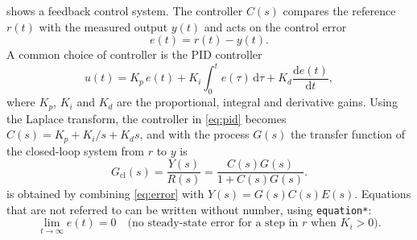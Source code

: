 \begin{instructions}
 shows a feedback control system. The controller $C(s)$ compares the reference $r(t)$ with the measured output $y(t)$ and acts on the control error
\begin{equation}
    e(t) = r(t) - y(t).
    \label{eq:error}
\end{equation}
A common choice of controller is the PID controller
\begin{equation}
    u(t) = K_p\, e(t) + K_i \int_0^t e(\tau)\,\mathrm{d}\tau + K_d \frac{\mathrm{d}e(t)}{\mathrm{d}t},
    \label{eq:pid}
\end{equation}
where $K_p$, $K_i$ and $K_d$ are the proportional, integral and derivative gains. Using the Laplace transform, the controller in \eqref{eq:pid} becomes $C(s) = K_p + K_i/s + K_d s$, and with the process $G(s)$ the transfer function of the closed-loop system from $r$ to $y$ is
\begin{equation}
    G_{\mathrm{cl}}(s) = \frac{Y(s)}{R(s)} = \frac{C(s)G(s)}{1 + C(s)G(s)}.
    \label{eq:closedloop}
\end{equation}
 is obtained by combining \eqref{eq:error} with $Y(s) = G(s)C(s)E(s)$.
Equations that are not referred to can be written without number, using \texttt{equation*}:
\begin{equation*}
    \lim_{t\to\infty} e(t) = 0 \quad \text{(no steady-state error for a step in $r$ when $K_i > 0$).}
\end{equation*}
\end{instructions}
